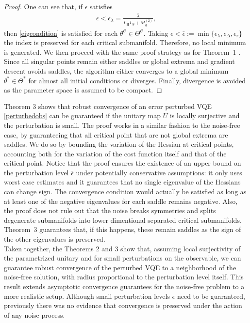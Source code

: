 \documentclass[letterpaper, 10 pt]{IEEEtran}  %
\begin{document}
\begin{proof}
   One can see that, if $\epsilon$ satisfies   
      \begin{align}
      \epsilon < {\epsilon}_\lambda=\frac{\bar\lambda}{L_\mathrm{H} L_\theta + M_g^{(2)}},
   \end{align}
   then \eqref{eigcondition} is satisfied for each $\theta^\mathcal{C} \in \Theta^\mathcal{C}$.
   Taking $\epsilon<\bar\epsilon:=\min \{\epsilon_\lambda, \epsilon_\Delta, \epsilon_r\}$ the index is preserved for each critical submanifold.
   Therefore, no local minimum is generated.
   We then proceed with the same proof strategy as for Theorem~1 \cite{Wiedmann2025}. 
   Since all singular points remain either saddles or global extrema and gradient descent avoids saddles, the algorithm either converges to a global minimum $\theta^* \in \Theta^*$ for almost all initial conditions or diverges.
   Finally, divergence is avoided as the parameter space is assumed to be compact. 
   
   
\end{proof}
Theorem 3 shows that robust convergence of an error perturbed VQE \eqref{perturbedobs} can be guaranteed if the unitary map $U$ is locally surjective and the perturbation is small. 
The proof works in a similar fashion to the noise-free case, by guaranteeing that all critical point that are not global extrema are saddles. We do so by bounding the variation of the Hessian at critical points, accounting both for the variation of the cost function itself and that of the critical point. 
Notice that the proof ensures the existence of an upper bound on the perturbation level $\bar\epsilon$ under potentially conservative assumptions: it only uses worst case estimates and it guarantees that no single eigenvalue of the Hessians can change sign. 
The convergence condition would actually be satisfied as long as at least one of the negative eigenvalues for each saddle remains negative. 
Also, the proof does not rule out that the noise breaks symmetries and splits degenerate submanifolds into lower dimentional separated critical submanifolds. Theorem~3 guarantees that, if this happens, 
these remain saddles as the sign of the other eigenvalues is preserved.  
\\   

Taken together, the Theorems 2 and 3 show that, assuming local surjectivity of the parametrized unitary and for small perturbations on the observable, we can guarantee robust convergence of the perturbed VQE to a neighborhood of the noise-free solution, with radius proportional to the perturbation level itself. 
This result extends asymptotic convergence guarantees for the noise-free problem to a more realistic setup. Although small perturbation levels $\epsilon$ need to be guaranteed, previously there was no evidence that convergence is preserved under the action of any noise process.  
\end{document}
